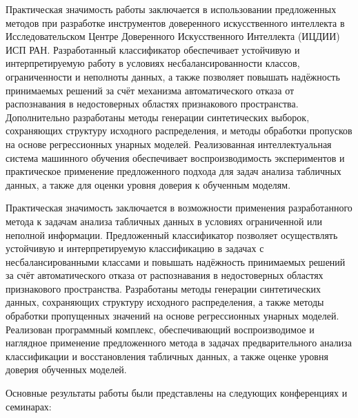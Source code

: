 Практическая значимость работы заключается в использовании предложенных методов при разработке инструментов доверенного искусственного интеллекта в Исследовательском Центре Доверенного Искусственного Интеллекта (ИЦДИИ) ИСП РАН. Разработанный классификатор обеспечивает устойчивую и интерпретируемую работу в условиях несбалансированности классов, ограниченности и неполноты данных, а также позволяет повышать надёжность принимаемых решений за счёт механизма автоматического отказа от распознавания в недостоверных областях признакового пространства. Дополнительно разработаны методы генерации синтетических выборок, сохраняющих структуру исходного распределения, и методы обработки пропусков на основе регрессионных унарных моделей. Реализованная интеллектуальная система машинного обучения обеспечивает воспроизводимость экспериментов и практическое применение предложенного подхода для задач анализа табличных данных, а также для оценки уровня доверия к обученным моделям.


Практическая значимость заключается в возможности применения разработанного метода к задачам анализа табличных данных в условиях ограниченной или неполной информации. Предложенный классификатор позволяет осуществлять устойчивую и интерпретируемую классификацию в задачах с несбалансированными классами и повышать надёжность принимаемых решений за счёт автоматического отказа от распознавания в недостоверных областях признакового пространства. Разработаны методы генерации синтетических данных, сохраняющих структуру исходного распределения, а также методы обработки пропущенных значений на основе регрессионных унарных моделей. Реализован программный комплекс, обеспечивающий воспроизводимое и наглядное применение предложенного метода в задачах предварительного анализа классификации и восстановления табличных данных, а также оценке уровня доверия обученных моделей.

{\probation}
Основные результаты работы были представлены на следующих конференциях и семинарах:

